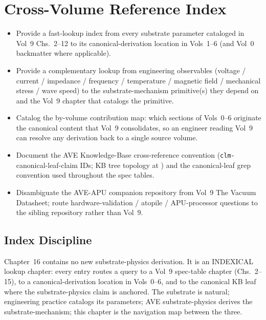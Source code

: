 \chapter{Cross-Volume Reference Index}
\label{ch:vol9_cross_volume_reference}

\begin{objectivebox}
\begin{itemize}
    \item Provide a fast-lookup index from every substrate parameter cataloged in Vol~9 Chs.~2--12 to its canonical-derivation location in Vols~1--6 (and Vol~0 backmatter where applicable).
    \item Provide a complementary lookup from engineering observables (voltage / current / impedance / frequency / temperature / magnetic field / mechanical stress / wave speed) to the substrate-mechanism primitive(s) they depend on and the Vol~9 chapter that catalogs the primitive.
    \item Catalog the by-volume contribution map: which sections of Vols~0--6 originate the canonical content that Vol~9 consolidates, so an engineer reading Vol~9 can resolve any derivation back to a single source volume.
    \item Document the AVE Knowledge-Base cross-reference convention (\texttt{clm-} canonical-leaf-claim IDs; KB tree topology at ) and the canonical-leaf grep convention used throughout the spec tables.
    \item Disambiguate the AVE-APU companion repository from Vol~9 The Vacuum Datasheet; route hardware-validation / atopile / APU-processor questions to the sibling repository rather than Vol~9.
\end{itemize}
\end{objectivebox}

\section{Index Discipline}
\label{sec:vol9_xref_discipline}

Chapter~16 contains no new substrate-physics derivation. It is an INDEXICAL lookup chapter: every entry routes a query to a Vol~9 spec-table chapter (Chs.~2--15), to a canonical-derivation location in Vols~0--6, and to the canonical KB leaf where the substrate-physics claim is anchored. The substrate is natural; engineering practice catalogs its parameters; AVE substrate-physics derives the substrate-mechanism; this chapter is the navigation map between the three.

